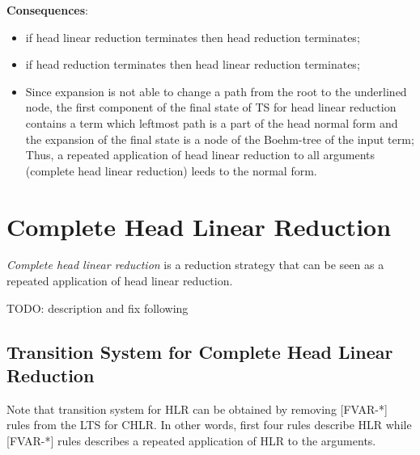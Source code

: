 \documentclass[a4paper, 10pt]{article}
\begin{document}
\textbf{Consequences}:
\begin{itemize}
\item if head linear reduction terminates then head reduction terminates;
\item if head reduction terminates then head linear reduction terminates;
\item Since expansion is not able to change a path from the root to the underlined node,
  the first component of the final state of TS for head linear reduction
  contains a term which leftmost path is a part of the head normal form 
  and the expansion of the final state is a node of the Boehm-tree of the input term; \\
  Thus, a repeated application of head linear reduction to all arguments
  (complete head linear reduction) leeds to the normal form.
\end{itemize}


\section{Complete Head Linear Reduction}
\emph{Complete head linear reduction} is a reduction strategy that can be seen as a repeated application
of head linear reduction.

TODO: description and fix following

\subsection{Transition System for Complete Head Linear Reduction}

Note that transition system for HLR can be obtained by removing [FVAR-*] rules from the LTS for CHLR. In other words, first four rules describe HLR while [FVAR-*] rules describes a repeated application of HLR to the arguments.
\end{document}
